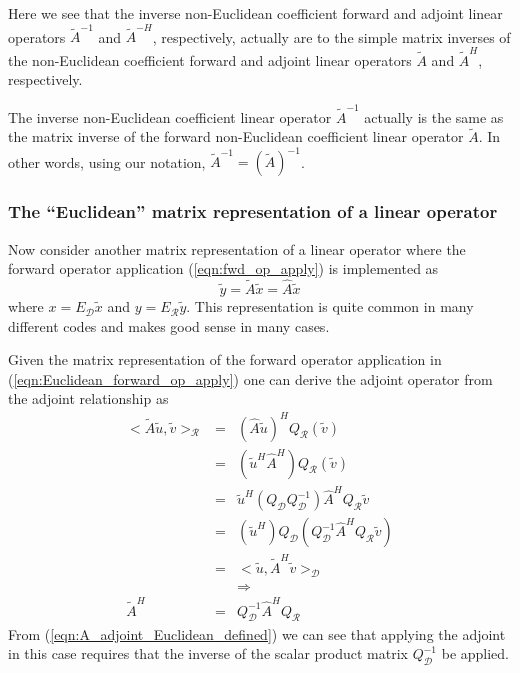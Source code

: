 Here we see that the inverse non-Euclidean coefficient forward and adjoint
linear operators $\tilde{A}^{-1} $ and $\tilde{A}^{-H}$, respectively,
actually are to the simple matrix inverses of the non-Euclidean coefficient
forward and adjoint linear operators $\tilde{A} $ and $\tilde{A}^H$,
respectively.

\begin{dumb_fact}
The inverse non-Euclidean coefficient linear operator $\tilde{A}^{-1}$
actually is the same as the matrix inverse of the forward non-Euclidean
coefficient linear operator $\tilde{A}$.  In other words, using our notation,
$\tilde{A}^{-1} = (\tilde{A})^{-1}$.
\end{dumb_fact}

\subsubsection{The ``Euclidean'' matrix representation of a linear operator}
\label{sec:Euclidean_matrix_rep_linear_operator}

Now consider another matrix representation of a linear operator where the
forward operator application (\ref{eqn:fwd_op_apply}) is implemented as
%
\begin{equation}
\tilde{y} = \tilde{A} \tilde{x} = \hat{A} \tilde{x}
\label{eqn:Euclidean_forward_op_apply}
\end{equation}
%
where $x = E_{\mathcal{D}}\tilde{x}$ and $y = E_{\mathcal{R}}\tilde{y}$.  This
representation is quite common in many different codes and makes good sense in
many cases.

Given the matrix representation of the forward operator application in
(\ref{eqn:Euclidean_forward_op_apply}) one can derive the adjoint operator
from the adjoint relationship as
%
\begin{eqnarray}
<\tilde{A} \tilde{u}, \tilde{v}>_{\mathcal{R}}
& = & ( \hat{A} \tilde{u} )^H Q_{\mathcal{R}} (\tilde{v}) \nonumber \\
& = & ( \tilde{u}^H \hat{A}^H ) Q_{\mathcal{R}} (\tilde{v}) \nonumber \\
& = & \tilde{u}^H ( Q_{\mathcal{D}} Q_{\mathcal{D}}^{-1} ) \hat{A}^H Q_{\mathcal{R}} \tilde{v} \nonumber \\
& = & ( \tilde{u}^H ) Q_{\mathcal{D}} ( Q_{\mathcal{D}}^{-1} \hat{A}^H Q_{\mathcal{R}} \tilde{v} ) \nonumber \\
& = & <\tilde{u}, \tilde{A}^H \tilde{v}>_{\mathcal{D}} \nonumber \\
&  & \Rightarrow \nonumber \\
\tilde{A}^H & = & Q_{\mathcal{D}}^{-1} \hat{A}^H Q_{\mathcal{R}}
\label{eqn:A_adjoint_Euclidean_defined}
\end{eqnarray}
%
From (\ref{eqn:A_adjoint_Euclidean_defined}) we can see that applying the
adjoint in this case requires that the inverse of the scalar product matrix
$Q_{\mathcal{D}}^{-1}$ be applied.

